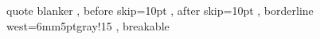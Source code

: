 \makeatletter
\g@addto@macro\bfseries{\boldmath}
\makeatother

\makeatletter
\def\defthm#1#2{%
  \newtheorem{#1}{#2}[section]%
  \expandafter\def\csname #1autorefname\endcsname{#2}%
  \expandafter\let\csname c@#1\endcsname\c@theorem}
\makeatother

\tcolorboxenvironment%
  {quote}{ blanker
         , before skip=10pt
         , after skip=10pt
         , borderline west={6mm}{5pt}{gray!15}
         , breakable
         }

\setcounter{tocdepth}{1}
